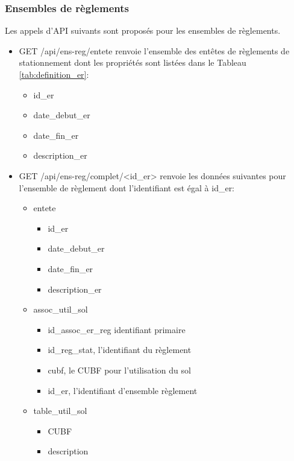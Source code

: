 \subsubsection{Ensembles de règlements}
Les appels d'\ac{API} suivants sont proposés pour les ensembles de règlements.
\begin{itemize}
    \item GET /api/ens-reg/entete renvoie l'ensemble des entêtes de règlements de stationnement dont les propriétés sont listées dans le Tableau \ref{tab:definition_er}:
    \begin{itemize}
        \item id\_er 
        \item date\_debut\_er
        \item date\_fin\_er
        \item description\_er
    \end{itemize}
    \item GET /api/ens-reg/complet/<id\_er> renvoie  les données suivantes pour l'ensemble de règlement dont l'identifiant est égal à id\_er:
        \begin{itemize}
            \item entete
                \begin{itemize}
                    \item id\_er
                    \item date\_debut\_er
                    \item date\_fin\_er
                    \item description\_er
                \end{itemize}
            \item assoc\_util\_sol
                \begin{itemize}
                    \item id\_assoc\_er\_reg identifiant primaire
                    \item id\_reg\_stat, l'identifiant du règlement
                    \item cubf, le \ac{CUBF} pour l'utilisation du sol
                    \item id\_er, l'identifiant d'ensemble règlement
                \end{itemize}
            \item table\_util\_sol
                \begin{itemize}
                    \item \ac{CUBF}
                    \item description
                \end{itemize}
        \end{itemize}
    

\end{itemize}

